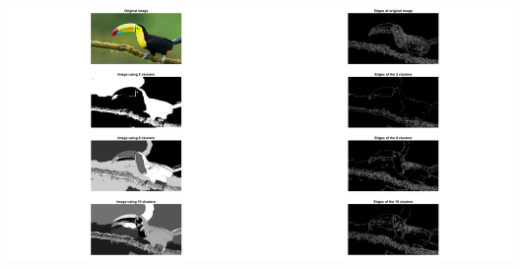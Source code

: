 \documentclass[11pt]{article}
\begin{document}
\begin{enumerate}
        \includegraphics[width=\textwidth]{Output Pictures/toucan_kmeans}\newline
    \end{enumerate}
\end{document}
